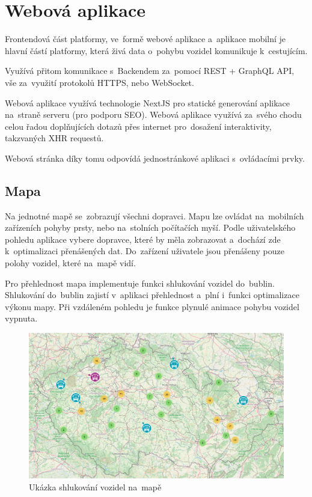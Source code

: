 \section{Webová aplikace}

Frontendová část platformy, ve~formě webové aplikace a~aplikace mobilní je hlavní částí platformy, která živá data o~pohybu vozidel komunikuje k~cestujícím.

Využívá přitom komunikace s~Backendem za~pomocí REST + GraphQL API, vše za~využití protokolů HTTPS, nebo WebSocket.

Webová aplikace využívá technologie NextJS pro statické generování aplikace na~straně serveru (pro podporu SEO). Webová aplikace využívá za~svého chodu celou řadou doplňujících dotazů přes internet pro~dosažení interaktivity, takzvaných XHR requestů.

Webová stránka díky tomu odpovídá jednostránkové aplikaci s~ovládacími prvky.

\subsection{Mapa}
Na jednotné mapě se~zobrazují všechni dopravci. Mapu lze ovládat na~mobilních zařízeních pohyby prsty, nebo na~stolních počítačích myší. Podle uživatelského pohledu aplikace vybere dopravce, které by měla zobrazovat a~dochází zde k~optimalizaci přenášených dat. Do~zařízení uživatele jsou přenášeny pouze polohy vozidel, které na~mapě vidí.

Pro přehlednost mapa implementuje funkci shlukování vozidel do~bublin. Shlukování do~bublin zajistí v~aplikaci přehlednost a~plní i~funkci optimalizace výkonu mapy. Při vzdáleném pohledu je funkce plynulé animace pohybu vozidel vypnuta.
\begin{figure}[H]
    \centering
    \includegraphics[width=1\textwidth]{images/global_map.png}
    \caption{Ukázka shlukování vozidel na~mapě}
    \label{shlukovani}
\end{figure}
